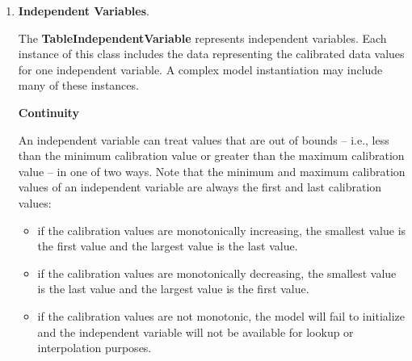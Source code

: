 \documentclass[11pt,fleqn]{report}
\begin{document}
\begin{enumerate}
\begin{enumerate}
   \textit{GenericMultiInputTable} thus created.
  \item \textbf{TableLookupSet}.  This class provides the management of
   the general situation where multiple dependent variables each
   depend on a subset of the available independent variables.  The number of
   dependent variables and independent variables is unconstrained.  This option
   supports a wider set of behaviors for dependent variables.
  \item \textbf{TableLookupTransposeDataSet}.  This class is a type of
  \textit{TableLookupSet}; it is used where data is presented in a transpose
  sense to that required for a \textit{TableLookupSet}.
  Typically, data is made
  available for each dependent-variable independently of the other dependent
  variables.  These data may be grouped into one data block, but typically such
  a block provides the data for the first variable, then the data for the
  second variable, and so on --
  ($x_1, x_2, x_3, ..., y_1, y_2, y_3, ..., z_1, z_2, z_3, ...$)

  Sometimes, data is presented differently -- the data block contains the data
  for the first calibration point for all dependent variables, then the data
  for the second calibration point, and so on --
  ($x_1, y_1, z_1, x_2, y_2, z_3, ...$)

  In this case, the \textit{TableLookupTransposeDataSet} can be used to process
  these data into a more conventional format, at which point it functions
  equivalently to a \textit{TableLookupSet}.
 \end{enumerate}

 \item \textbf{Independent Variables}.

    The \textbf{TableIndependentVariable} represents
    independent variables.  Each instance of this class includes the data
    representing the calibrated data values for one independent variable.  A
    complex model instantiation may include many of these instances.

    \textbf{Continuity}

    An independent variable can treat values that are out of bounds -- i.e.,
    less than the minimum calibration value or greater than the maximum
    calibration value -- in one of two ways.
    Note that the minimum and maximum calibration values of an independent
    variable are always the first and last calibration values:
    \begin{itemize}
    \item if the calibration values are monotonically increasing, the smallest
    value is the first value and the largest value is the last value.
    \item if the calibration values are monotonically decreasing, the smallest
    value is the last value and the largest value is the first value.
    \item if the calibration values are not monotonic, the model will fail to
    initialize and the independent variable will not be available for lookup or
    interpolation purposes.
    \end{itemize}


\end{enumerate}
\end{document}
